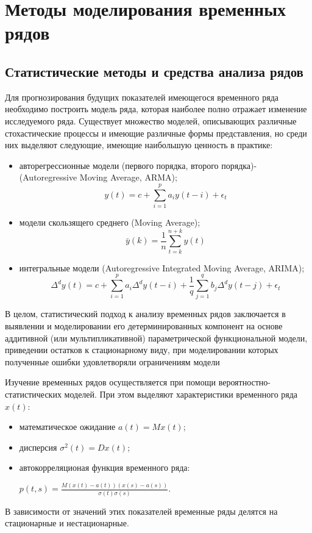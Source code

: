 \linespread{1.11}\selectfont

\chapter{Методы моделирования временных рядов}
\section{Статистические методы и средства анализа рядов}
Для прогнозирования будущих показателей имеющегося временного ряда   необходимо построить модель ряда,  которая наиболее полно отражает изменение  исследуемого ряда. Существует множество  моделей, описывающих различные  стохастические процессы и имеющие  различные формы представления, но среди  них выделяют следующие, имеющие наибольшую  ценность в практике:
\begin{itemize}
\item авторегрессионные модели (первого порядка, второго порядка)- \\(Autoregressive Moving Average, ARMA);
$$
	y(t)=c + \sum _{i=1}^{p} {a_i  y(t-i)} + \epsilon_t
$$

\item модели скользящего среднего (Moving Average);
$$
	\bar y(k) = \frac {1} {n} \sum _ {t=k} ^ {n+k} {y(t)}
$$

\item интегральные модели (Autoregressive Integrated  	Moving Average, ARIMA);
$$
	\Delta ^ d y(t)=c + \sum _{i=1} ^{p} {a_i  \Delta ^ d y(t-i)} + \frac {1} {q} \sum _{j=1} ^{q} {b_j \Delta ^ d y(t-j)} + \epsilon_t
$$
\end{itemize} 

В целом, статистический подход к анализу временных рядов заключается в выявлении и моделировании его детерминированных компонент на основе аддитивной (или мультипликативной) параметрической функциональной модели, приведении остатков к стационарному виду, при моделировании которых полученные ошибки удовлетворяли ограничениям модели

Изучение временных рядов осуществляется при помощи вероятностно-статистических моделей. При этом выделяют характеристики временного ряда $x(t)$:
\begin{itemize}
\item математическое ожидание $a(t) = Mx(t)$;
\item дисперсия $\sigma^2(t) = Dx(t)$;
\item автокорреляционая функция временного ряда: 

$p(t,s) = \frac{M(x(t)-a(t))(x(s)-a(s))}{\sigma(t)\sigma(s)}$.
\end{itemize}
В зависимости от значений этих показателей временные ряды делятся на стационарные и нестационарные.

